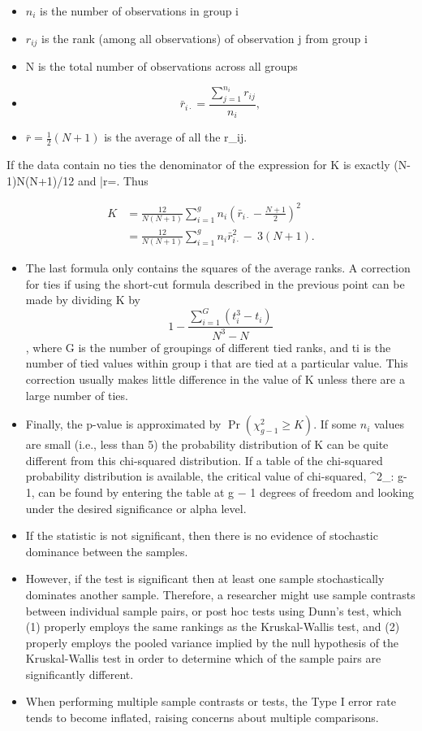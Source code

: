 \begin{itemize}
\item $n_i$ is the number of observations in group i
\item $r_{ij}$ is the rank (among all observations) of observation j from group i
\item N is the total number of observations across all groups
\item \[\bar{r}_{i\cdot} = \frac{\sum_{j=1}^{n_i}{r_{ij}}}{n_i},\]
\item $\bar{r} =\tfrac 12 (N+1)$ is the average of all the r_{ij}.
\end{itemize}

If the data contain no ties the denominator of the expression for K is exactly (N-1)N(N+1)/12 and \bar{r}=. Thus

\begin{align}
K & = \frac{12}{N(N+1)}\sum_{i=1}^g n_i \left(\bar{r}_{i\cdot} - \frac{N+1}{2}\right)^2 \\ & = \frac{12}{N(N+1)}\sum_{i=1}^g n_i \bar{r}_{i\cdot }^2 -\ 3(N+1).
\end{align}

\begin{itemize}
\item The last formula only contains the squares of the average ranks.
A correction for ties if using the short-cut formula described in the previous point can be made by dividing K by \[1 - \frac{\sum_{i=1}^G (t_i^3 - t_i)}{N^3-N}\], where G is the number of groupings of different tied ranks, and ti is the number of tied values within group i that are tied at a particular value. This correction usually makes little difference in the value of K unless there are a large number of ties.
\item Finally, the p-value is approximated by $\Pr(\chi^2_{g-1} \ge K)$. If some $n_i$ values are small (i.e., less than 5) the probability distribution of K can be quite different from this chi-squared distribution. If a table of the chi-squared probability distribution is available, the critical value of chi-squared, \chi^2_{\alpha: g-1}, can be found by entering the table at g − 1 degrees of freedom and looking under the desired significance or alpha level.
\item If the statistic is not significant, then there is no evidence of stochastic dominance between the samples. 
\item However, if the test is significant then at least one sample stochastically dominates another sample. Therefore, a researcher might use sample contrasts between individual sample pairs, or post hoc tests using Dunn's test, which (1) properly employs the same rankings as the Kruskal-Wallis test, and (2) properly employs the pooled variance implied by the null hypothesis of the Kruskal-Wallis test in order to determine which of the sample pairs are significantly different.
\item When performing multiple sample contrasts or tests, the Type I error rate tends to become inflated, raising concerns about multiple comparisons.
\end{itemize}

